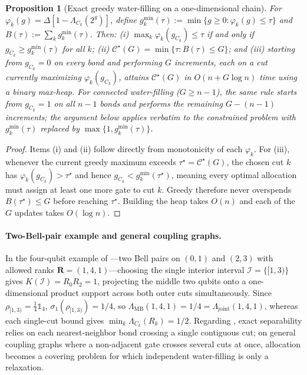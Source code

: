 \documentclass[reprint,aps,pra,floatfix,superscriptaddress,nofootinbib,longbibliography]{revtex4-2}
\newtheorem{proposition}[theorem]{Proposition}
\theoremstyle{remark}
\theoremstyle{definition}
\newcommand{\calC}{\mathcal{C}}
\begin{document}
\begin{proposition}[Exact greedy water-filling on a one-dimensional chain]
\label{prop:waterfill}
For $\varphi_k(g)=\Delta[1-\Lambda_{C_k}(2^g)]$, define
$g_k^{\min}(\tau):=\min\{g\ge0:\varphi_k(g)\le\tau\}$ and $B(\tau):=\sum_k g_k^{\min}(\tau)$.
Then: (i) $\max_k\varphi_k(g_{C_k})\le\tau$ if and only if $g_{C_k}\ge g_k^{\min}(\tau)$
for all $k$; (ii) $\calC^\star(G)=\min\{\tau:B(\tau)\le G\}$; and (iii) starting from $g_{C_k}=0$ on every bond and performing $G$ increments,
each on a cut currently maximizing $\varphi_k(g_{C_k})$, attains
$\calC^\star(G)$ in $O(n+G\log n)$ time using a binary max-heap. For connected
water-filling ($G\ge n-1$), the same rule starts from $g_{C_k}=1$ on all $n-1$
bonds and performs the remaining $G-(n-1)$ increments; the argument below applies
verbatim to the constrained problem with $g_k^{\min}(\tau)$ replaced by
$\max\{1,g_k^{\min}(\tau)\}$.
\end{proposition}

\begin{proof}
Items (i) and (ii) follow directly from monotonicity of each $\varphi_k$. For
(iii), whenever the current greedy maximum exceeds $\tau^\star=\calC^\star(G)$,
the chosen cut $k$ has $\varphi_k(g_{C_k})>\tau^\star$ and hence
$g_{C_k}<g_k^{\min}(\tau^\star)$, meaning every optimal allocation must assign at
least one more gate to cut $k$. Greedy therefore never overspends $B(\tau^\star)\le G$
before reaching $\tau^\star$. Building the heap takes $O(n)$ and each of the $G$
updates takes $O(\log n)$.
\end{proof}

\paragraph{Two-Bell-pair example and general coupling graphs.}
In the four-qubit example of ---two Bell pairs on $(0,1)$ and
$(2,3)$ with allowed ranks $\mathbf{R}=(1,4,1)$---choosing the single interior
interval $\mathcal{I}=\{[1,3)\}$ gives $K(\mathcal{I})=R_0 R_2=1$, projecting the
middle two qubits onto a one-dimensional product support across both outer cuts
simultaneously. Since $\rho_{[1,3)}=\tfrac14\mathbb{1}_4$, $\sigma_1(\rho_{[1,3)})=1/4$,
so $\Lambda_{\mathrm{MB}}(1,4,1)=1/4=\Lambda_{\mathrm{joint}}(1,4,1)$, whereas
each single-cut bound gives $\min_k\Lambda_{C_k}(R_k)=1/2$. Regarding
, exact separability relies on each nearest-neighbor bond
crossing a single contiguous cut; on general coupling graphs where a
non-adjacent gate crosses several cuts at once, allocation becomes a covering
problem for which independent water-filling is only a relaxation.
\end{document}
